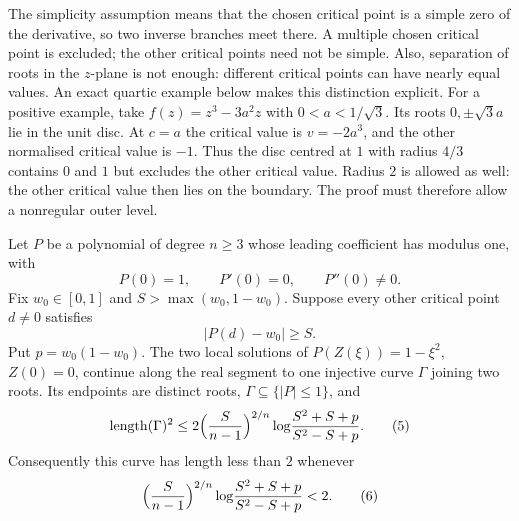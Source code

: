 The simplicity assumption means that the chosen critical point is a simple
zero of the derivative, so two inverse branches meet there. A multiple
chosen critical point is excluded; the other critical points need not be
simple. Also, separation of roots in the $z$-plane
is not enough: different critical points can have nearly equal values.
An exact quartic example below makes this distinction explicit.
For a positive example, take $f(z)=z^3-3a^2z$ with $0<a<1/\sqrt3$.
Its roots $0,\pm\sqrt3a$ lie in the unit disc. At $c=a$ the critical
value is $v=-2a^3$, and the other normalised critical value is $-1$.
Thus the disc centred at $1$ with radius $4/3$ contains $0$ and $1$
but excludes the other critical value. Radius $2$ is allowed as well:
the other critical value then lies on the boundary. The proof must
therefore allow a nonregular outer level.

\begin{remark}
\label{res:critical-value-separation}
Let $P$ be a polynomial of degree $n\ge3$ whose leading coefficient has
modulus one, with
\[
 P(0)=1,\qquad P'(0)=0,\qquad P''(0)\ne0.
\]
Fix $w_0\in[0,1]$ and $S>\max(w_0,1-w_0)$.  Suppose every other critical
point $d\ne0$ satisfies
\[
 |P(d)-w_0|\ge S.                                      \tag{4}
\]
Put $p=w_0(1-w_0)$.  The two local solutions of
$P(Z(\xi))=1-\xi^2$, $Z(0)=0$, continue along the real segment to one
injective curve $\Gamma$ joining two roots.  Its endpoints are distinct roots,
$\Gamma\subseteq\{|P|\le1\}$, and
\begin{equation*}\label{eq:disk-family-length}
 \operatorname{length}(\Gamma)^2
 \le 2\Bigl(\frac{S}{n-1}\Bigr)^{2/n}
 \log\!\frac{S^2+S+p}{S^2-S+p}.                       \tag{5}
\end{equation*}
Consequently this curve has length less than $2$ whenever
\begin{equation*}\label{eq:disk-family-coefficient}
 \Bigl(\frac{S}{n-1}\Bigr)^{2/n}
 \log\!\frac{S^2+S+p}{S^2-S+p}<2.                    \tag{6}
\end{equation*}
\end{remark}


